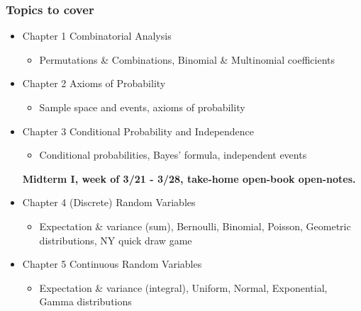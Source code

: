 \documentclass[slidestop,compress,mathserif]{beamer}
\begin{document}
\begin{frame}\frametitle{Topics to cover}
\begin{itemize}

\item Chapter 1 Combinatorial Analysis
\begin{itemize}
\item Permutations \& Combinations, Binomial \& Multinomial coefficients
\end{itemize}

\item Chapter 2 Axioms of Probability
\begin{itemize}
\item Sample space and events, axioms of probability
\end{itemize}



\item Chapter 3 Conditional Probability and Independence
\begin{itemize}
\item Conditional probabilities, Bayes' formula, independent events
\end{itemize}

{\bf \large {\color{VassarRed}Midterm I, week of 3/21 - 3/28, take-home open-book open-notes.}}

\pause

\item Chapter 4 (Discrete) Random Variables
\begin{itemize}
\item Expectation \& variance (sum), Bernoulli, Binomial, Poisson, Geometric
distributions, NY quick draw game
\end{itemize}

\item Chapter 5 Continuous Random Variables
\begin{itemize}
\item Expectation \& variance (integral), Uniform, Normal, Exponential,
Gamma distributions
\end{itemize}

\end{itemize}

\end{frame}
\end{document}
